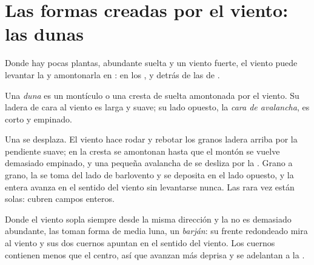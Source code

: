 \section{Las formas creadas por el viento: las dunas}

Donde hay pocas plantas, abundante  suelta y un viento fuerte, el
viento puede levantar la  y amontonarla en : en los ,
y detrás de las  de .

\begin{definition}[Duna]\label{def:g9:landforms:dune}
Una \emph{duna} es un montículo o una cresta de  suelta
amontonada por el viento. Su ladera de cara al viento es larga y suave; su
lado opuesto, la \emph{cara de avalancha}, es
corto y empinado.
\end{definition}

Una  se desplaza. El viento hace rodar y rebotar los granos ladera
arriba por la pendiente suave; en la cresta se amontonan hasta que el
montón se vuelve demasiado empinado, y una pequeña avalancha de  se
desliza por la . Grano a grano, la  se toma del lado
de barlovento y se deposita en el lado opuesto, y la  entera avanza en
el sentido del viento sin levantarse nunca. Las  rara vez están
solas: cubren campos enteros.

Donde el viento sopla siempre desde la misma dirección y la  no es
demasiado abundante, las  toman forma de media luna, un
\emph{barján}: su frente redondeado mira al viento y sus dos cuernos
apuntan en el sentido del viento. Los cuernos contienen menos  que el
centro, así que avanzan más deprisa y se adelantan a la .

